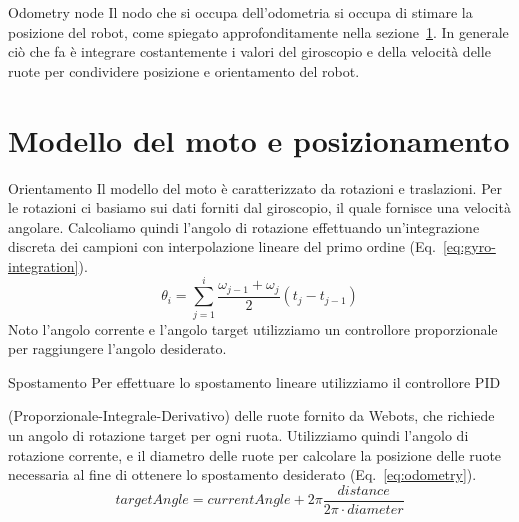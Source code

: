 \documentclass[10pt]{beamer}
\begin{document}
	\begin{frame}{Odometry node}
	Il nodo che si occupa dell'odometria si occupa di stimare la posizione del
	robot, come spiegato approfonditamente nella
	sezione~\ref{sec:Modello-del-moto-e-posizionamento}. In generale ciò che fa
	è integrare costantemente i valori del giroscopio e della velocità delle
	ruote per condividere posizione e orientamento del robot.
	\end{frame}
	
	

	\section{Modello del moto e posizionamento}\label{sec:Modello-del-moto-e-posizionamento} 
	\frame{\sectionpage}
	
	\begin{frame}{Orientamento}
		Il modello del moto è caratterizzato da rotazioni e traslazioni. Per le
		rotazioni ci basiamo sui dati forniti dal giroscopio, il quale fornisce
		una velocità angolare. Calcoliamo quindi l'angolo di rotazione
		effettuando un'integrazione discreta dei campioni con interpolazione
		lineare del primo ordine (Eq.~\ref{eq:gyro-integration}).  
		\begin{equation}\label{eq:gyro-integration}
			\theta_i = \sum_{j=1}^i \frac{\omega _{j-1}+\omega _j}{2} \left( t_j-t_{j-1} \right) 
		\end{equation}
		Noto l'angolo corrente e l'angolo target utilizziamo un controllore
		proporzionale per raggiungere l'angolo desiderato.
	\end{frame}
	
	\begin{frame}{Spostamento}
		Per effettuare lo spostamento lineare utilizziamo il controllore PID
		
		(Proporzionale-Integrale-Derivativo) delle ruote fornito da Webots, che
		richiede un angolo di rotazione target per ogni ruota. Utilizziamo quindi
		l'angolo di rotazione corrente, e il diametro delle ruote per calcolare la
		posizione delle ruote necessaria al fine di ottenere lo spostamento
		desiderato (Eq.~\ref{eq:odometry}).
		\begin{equation}\label{eq:odometry}
		targetAngle =
		currentAngle+2\pi\frac    {distance}
						{2\pi \cdot diameter}
		\end{equation}
	\end{frame}
	
\end{document}
